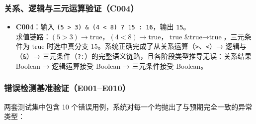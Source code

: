 \documentclass[a4paper]{article}
\begin{document}
\subsubsection{关系、逻辑与三元运算验证（C004）}

\begin{itemize}
    \item \textbf{C004}：输入 \texttt{(5 > 3) \& (4 < 8) ? 15 : 16}，输出 \texttt{15}。\\
    求值链路：$(5>3) \to \text{true}$，$(4<8) \to \text{true}$，$\text{true \& true} \to \text{true}$，三元条件为 true 时选中真分支 15。系统正确完成了从关系运算（\texttt{>}、\texttt{<}）→ 逻辑与（\texttt{\&}）→ 三元条件（\texttt{?:}）的完整语义链路，且各阶段类型推导无误：关系结果 Boolean → 逻辑运算接受 Boolean → 三元条件接受 Boolean。
\end{itemize}

\subsubsection{错误检测基准验证（E001--E010）}

两套测试集中包含 10 个错误用例，系统对每一个均抛出了与预期完全一致的异常类型：
\end{document}

